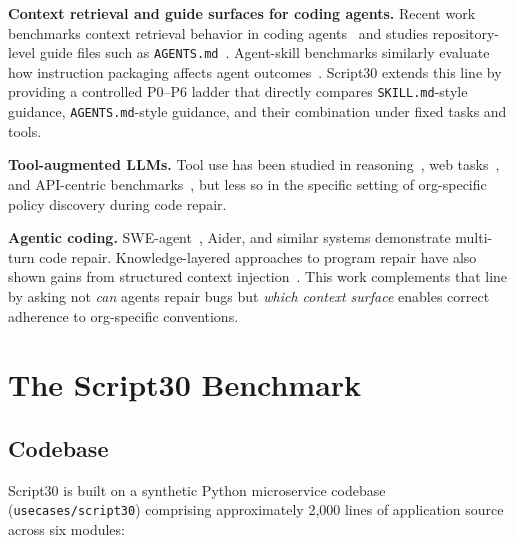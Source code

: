 \documentclass[10pt,a4paper,twocolumn]{article}
\begin{document}
\textbf{Context retrieval and guide surfaces for coding agents.}
Recent work benchmarks context retrieval behavior in coding agents~\citep{cai2026contextbench} and studies repository-level guide files such as \texttt{AGENTS.md}~\citep{gloaguen2026agentsmd}.
Agent-skill benchmarks similarly evaluate how instruction packaging affects agent outcomes~\citep{li2026skillsbench}.
Script30 extends this line by providing a controlled P0--P6 ladder that directly compares \texttt{SKILL.md}-style guidance, \texttt{AGENTS.md}-style guidance, and their combination under fixed tasks and tools.

\textbf{Tool-augmented LLMs.}
Tool use has been studied in reasoning~\citep{schick2023toolformer}, web tasks~\citep{yao2023react}, and API-centric benchmarks~\citep{li2023apibank}, but less so in the specific setting of org-specific policy discovery during code repair.

\textbf{Agentic coding.}
SWE-agent~\citep{yang2024sweagent}, Aider, and similar systems demonstrate multi-turn code repair.
Knowledge-layered approaches to program repair have also shown gains from structured context injection~\citep{ehsani2025hierarchical}.
This work complements that line by asking not \emph{can} agents repair bugs but \emph{which context surface} enables correct adherence to org-specific conventions.

\section{The Script30 Benchmark}
\label{sec:benchmark}

\subsection{Codebase}
\label{sec:codebase}

Script30 is built on a synthetic Python microservice codebase (\texttt{usecases/script30}) comprising approximately 2,000 lines of application source across six modules:
\end{document}
